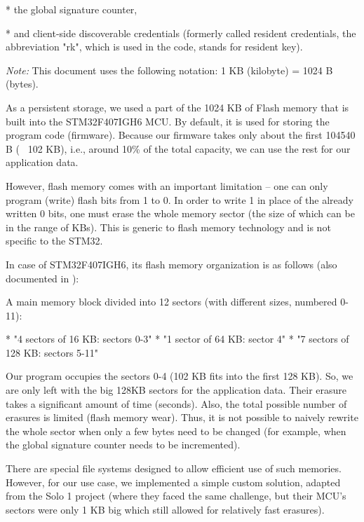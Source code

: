* the global signature counter,

* and client-side discoverable credentials (formerly called resident credentials, the abbreviation "rk", which is used in the code, stands for {\sbf r}esident {\sbf k}ey).

\enditems

{\em Note:} This document uses the following notation: 1 KB (kilobyte) = 1024 B (bytes).

As a persistent storage, we used {\sbf a part of the 1024 KB of Flash memory} that is built into the STM32F407IGH6 MCU. By default, it is used for storing the program code (firmware). Because our firmware takes only about the first 104540 B (~ 102 KB), i.e., around 10\% of the total capacity, we can use the rest for our application data.

However, flash memory comes with {\sbf an important limitation} – one can only program (write) flash bits from 1 to 0. In order to write 1 in place of the already written 0 bits, one must {\sbf erase the whole memory sector} (the size of which can be in the range of KBs). This is generic to flash memory technology and is not specific to the STM32.

In case of STM32F407IGH6, its flash memory organization is as follows (also documented in ):

A main memory block divided into 12 sectors (with different sizes, numbered 0-11):

\begitems

* "4 sectors of 16 KB: sectors 0-3"
* "1 sector of 64 KB: sector 4"
* "7 sectors of 128 KB: sectors 5-11"

\enditems

Our program occupies the sectors 0-4 (102 KB fits into the first 128 KB). So, we are only left with the big 128KB sectors for the application data. {\sbf Their erasure takes a significant amount of time} (seconds). Also, the total possible number of erasures is limited ({\sbf flash memory wear}). Thus, it is not possible to naively rewrite the whole sector when only a few bytes need to be changed (for example, when the global signature counter needs to be incremented).

There are special file systems designed to allow efficient use of such memories. However, for our use case, {\sbf we implemented a simple custom solution, adapted from the Solo 1 project} (where they faced the same challenge, but their MCU’s sectors were only 1 KB big which still allowed for relatively fast erasures).

